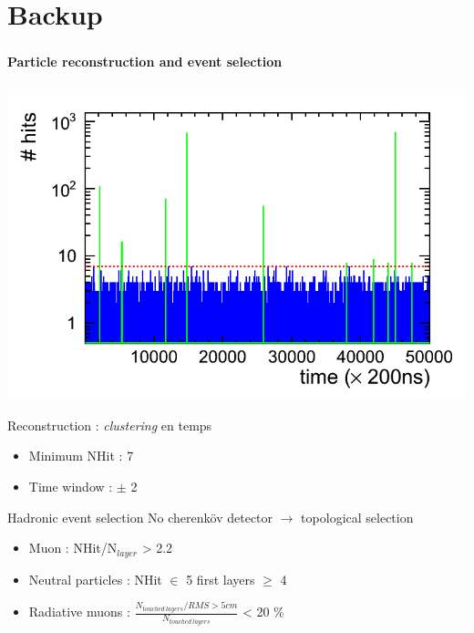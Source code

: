 \documentclass[8pt]{beamer}
\begin{document}
  

  \section*{Backup}

  \begin{frame}
  \frametitle{\secname}
  \framesubtitle{Particle reconstruction and event selection}
    \begin{minipage}{0.4\linewidth}
      \includegraphics[width=\linewidth]{sdhcal_time_spectrum.png}
    \end{minipage} \hfill
    \begin{minipage}{0.58\linewidth}
      \begin{block}{Reconstruction : \textit{clustering} en temps}
        \begin{itemize}
          \item Minimum NHit : 7
          \item Time window : $\pm$ 2
        \end{itemize}
      \end{block}
    \end{minipage}
    \pause
    \begin{minipage}{0.6\linewidth}
      \begin{block}{Hadronic event selection}
        No cherenköv detector $\rightarrow$ topological selection
        \begin{itemize}
          \item Muon : NHit/N$_{layer}$ > 2.2
          \item Neutral particles : NHit $\in$ 5 first layers $\geq$ 4
          \item Radiative muons : $\frac{N_{touched~layers}/RMS>5cm}{N_{touched~layers}}$ < 20 \%

\end{itemize}
\end{block}
\end{minipage}
\end{frame}
\end{document}
